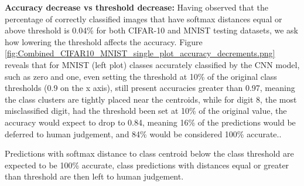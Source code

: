 \noindent \textbf{Accuracy decrease vs threshold decrease:} Having observed that the percentage of correctly classified images that have softmax distances equal or above threshold is 0.04\% for both CIFAR-10 and MNIST testing datasets, we ask how lowering the threshold affects the accuracy. Figure \ref{fig:Combined_CIFAR10_MNIST_single_plot_accuracy_decrements.png} reveals that for MNIST (left plot) classes accurately classified by the CNN model, such as zero and one, even setting the threshold at 10\% of the original class thresholds (0.9 on the x axis), still present accuracies greater than 0.97, meaning the class clusters are tightly placed near the centroids, while for digit 8, the most misclassified digit, had the threshold been set at 10\% of the original value, the accuracy would expect to drop to 0.84, meaning 16\% of the predictions would be deferred to human judgement, and 84\% would be considered 100\% accurate..

Predictions with softmax distance to class centroid below the class threshold are expected to be 100\% accurate, class predictions with distances equal or greater than threshold are then left to human judgement.






